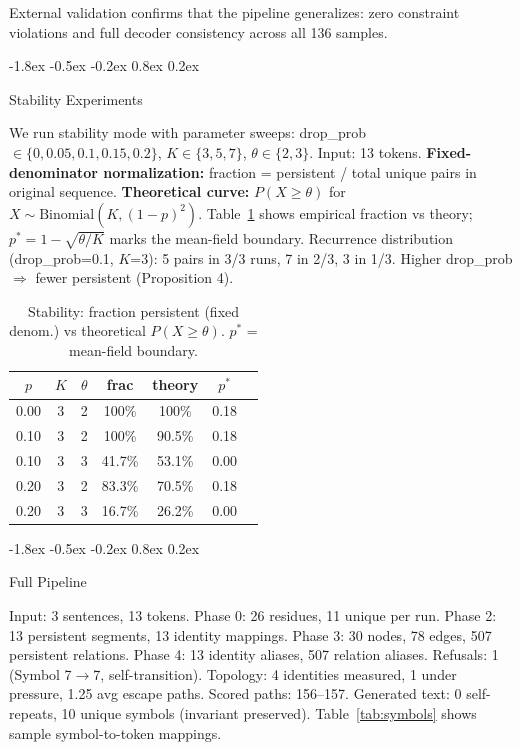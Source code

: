 \documentclass[10pt]{article}
\makeatletter
\renewcommand{\subsection}{\@startsection{subsection}{2}{\z@}%
  {-1.8ex \@plus -0.5ex \@minus -0.2ex}%
  {0.8ex \@plus 0.2ex}%
  {\normalsize\bfseries\raggedright}}
\makeatother
\begin{document}
External validation confirms that the pipeline generalizes: zero constraint violations and full decoder consistency across all 136 samples.

\subsection{Stability Experiments}

We run stability mode with parameter sweeps: drop\_prob $\in \{0, 0.05, 0.1, 0.15, 0.2\}$, $K \in \{3, 5, 7\}$, $\theta \in \{2, 3\}$. Input: 13 tokens. \textbf{Fixed-denominator normalization:} fraction = persistent / total unique pairs in original sequence. \textbf{Theoretical curve:} $P(X \geq \theta)$ for $X \sim \text{Binomial}(K, (1-p)^2)$. Table~\ref{tab:stability} shows empirical fraction vs theory; $p^* = 1 - \sqrt{\theta/K}$ marks the mean-field boundary. Recurrence distribution (drop\_prob=0.1, $K$=3): 5 pairs in 3/3 runs, 7 in 2/3, 3 in 1/3. Higher drop\_prob $\Rightarrow$ fewer persistent (Proposition 4).

\begin{table}[t]
\centering
\caption{Stability: fraction persistent (fixed denom.) vs theoretical $P(X \geq \theta)$. $p^*$ = mean-field boundary.}
\label{tab:stability}
\begin{tabular}{ccccccc}
\toprule
\textbf{$p$} & \textbf{$K$} & \textbf{$\theta$} & \textbf{frac} & \textbf{theory} & \textbf{$p^*$} \\
\midrule
0.00 & 3 & 2 & 100\% & 100\% & 0.18 \\
0.10 & 3 & 2 & 100\% & 90.5\% & 0.18 \\
0.10 & 3 & 3 & 41.7\% & 53.1\% & 0.00 \\
0.20 & 3 & 2 & 83.3\% & 70.5\% & 0.18 \\
0.20 & 3 & 3 & 16.7\% & 26.2\% & 0.00 \\
\bottomrule
\end{tabular}
\end{table}

\subsection{Full Pipeline}

Input: 3 sentences, 13 tokens. Phase 0: 26 residues, 11 unique per run. Phase 2: 13 persistent segments, 13 identity mappings. Phase 3: 30 nodes, 78 edges, 507 persistent relations. Phase 4: 13 identity aliases, 507 relation aliases. Refusals: 1 (Symbol 7$\rightarrow$7, self-transition). Topology: 4 identities measured, 1 under pressure, 1.25 avg escape paths. Scored paths: 156--157. Generated text: 0 self-repeats, 10 unique symbols (invariant preserved). Table~\ref{tab:symbols} shows sample symbol-to-token mappings.
\end{document}
